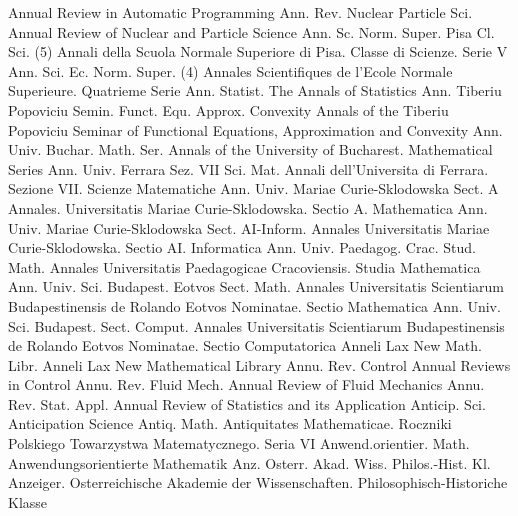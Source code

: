 {Annual Review in Automatic Programming}
{Ann. Rev. Nuclear Particle Sci.}
{Annual Review of Nuclear and Particle Science}
{Ann. Sc. Norm. Super. Pisa Cl. Sci. (5)}
{Annali della Scuola Normale Superiore di Pisa. Classe di Scienze. Serie V}
{Ann. Sci. Ec. Norm. Super. (4)}
{Annales Scientifiques de l'Ecole Normale Superieure. Quatrieme Serie}
{Ann. Statist.}
{The Annals of Statistics}
{Ann. Tiberiu Popoviciu Semin. Funct. Equ. Approx. Convexity}
{Annals of the Tiberiu Popoviciu Seminar of Functional Equations, Approximation and Convexity}
{Ann. Univ. Buchar. Math. Ser.}
{Annals of the University of Bucharest. Mathematical Series}
{Ann. Univ. Ferrara Sez. VII Sci. Mat.}
{Annali dell'Universita di Ferrara. Sezione VII. Scienze Matematiche}
{Ann. Univ. Mariae Curie-Sklodowska Sect. A}
{Annales. Universitatis Mariae Curie-Sklodowska. Sectio A. Mathematica}
{Ann. Univ. Mariae Curie-Sklodowska Sect. AI-Inform.}
{Annales Universitatis Mariae Curie-Sklodowska. Sectio AI. Informatica}
{Ann. Univ. Paedagog. Crac. Stud. Math.}
{Annales Universitatis Paedagogicae Cracoviensis. Studia Mathematica}
{Ann. Univ. Sci. Budapest. Eotvos Sect. Math.}
{Annales Universitatis Scientiarum Budapestinensis de Rolando Eotvos Nominatae. Sectio Mathematica}
{Ann. Univ. Sci. Budapest. Sect. Comput.}
{Annales Universitatis Scientiarum Budapestinensis de Rolando Eotvos Nominatae. Sectio Computatorica}
{Anneli Lax New Math. Libr.}
{Anneli Lax New Mathematical Library}
{Annu. Rev. Control}
{Annual Reviews in Control}
{Annu. Rev. Fluid Mech.}
{Annual Review of Fluid Mechanics}
{Annu. Rev. Stat. Appl.}
{Annual Review of Statistics and its Application}
{Anticip. Sci.}
{Anticipation Science}
{Antiq. Math.}
{Antiquitates Mathematicae. Roczniki Polskiego Towarzystwa Matematycznego. Seria VI}
{Anwend.orientier. Math.}
{Anwendungsorientierte Mathematik}
{Anz. Osterr. Akad. Wiss. Philos.-Hist. Kl.}
{Anzeiger. Osterreichische Akademie der Wissenschaften. Philosophisch-Historiche Klasse}
